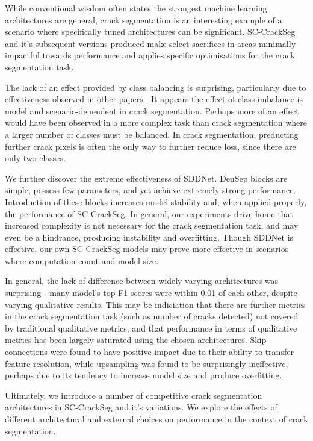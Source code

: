 \documentclass[a4paper,12pt]{report}
\begin{document}
While conventional wisdom often states the strongest machine learning architectures are general, crack segmentation is an interesting example of a scenario where specifically tuned architectures can be significant. SC-CrackSeg and it's subsequent versions produced make select sacrifices in areas minimally impactful towards performance and applies specific optimisations for the crack segmentation task.

The lack of an effect provided by class balancing is surprising, particularly due to effectiveness observed in other papers \cite{liu_deepcrack_2019}. It appears the effect of class imbalance is model and scenario-dependent in crack segmentation. Perhaps more of an effect would have been observed in a more complex task than crack segmentation where a larger number of classes must be balanced. In crack segmentation, preducting further crack pixels is often the only way to further reduce loss, since there are only two classes.

We further discover the extreme effectiveness of SDDNet. DenSep blocks are simple, possess few parameters, and yet achieve extremely strong performance. Introduction of these blocks increases model stability and, when applied properly, the performance of SC-CrackSeg. In general, our experiments drive home that increased complexity is not necessary for the crack segmentation task, and may even be a hindrance, producing instability and overfitting. Though SDDNet is effective, our own SC-CrackSeg models may prove more effective in scenarios where computation count and model size.

In general, the lack of difference between widely varying architectures was surprising - many model's top F1 scores were within 0.01 of each other, despite varying qualitative results. This may be indiciation that there are further metrics in the crack segmentation task (such as number of cracks detected) not covered by traditional qualitative metrics, and that performance in terms of qualitative metrics has been largely saturated using the chosen architectures. Skip connections were found to have positive impact due to their ability to transfer feature resolution, while upsampling was found to be surprisingly ineffective, perhaps due to its tendency to increase model size and produce overfitting.

Ultimately, we introduce a number of competitive crack segmentation architectures in SC-CrackSeg and it's variations. We explore the effects of different architectural and external choices on performance in the context of crack segmentation.
\end{document}
